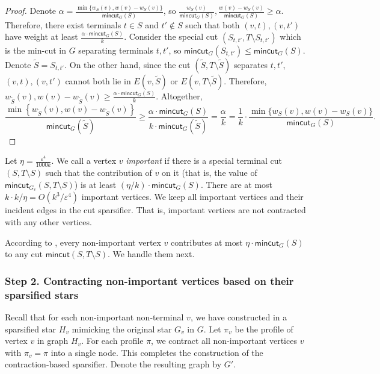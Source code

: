 \documentclass[11pt]{article}
\theoremstyle{definition}
\newcommand{\set}[1]{\left\{ #1 \right\}}
\newcommand{\eps}{{\varepsilon}}
\newcounter{note}
\newcommand{\mc}{\mathsf{mincut}}
\begin{document}
\begin{proof}
Denote $\alpha=\frac{\min \{w_{S}(v),w(v)-w_{S}(v)\}}{\mc_G(S)}$, so $\frac{w_S(v)}{\mc_G(S)},\frac{w(v)-w_S(v)}{\mc_G(S)}\ge \alpha$. Therefore, there exist terminals $t\in S$ and $t' \notin S$ such that both $(v,t),(v,t')$ have weight at least $\frac{\alpha \cdot \mc_G(S)}{k}$. Consider the special cut $(S_{t,t'},T\setminus S_{t,t'})$ which is the min-cut in $G$ separating terminals $t,t'$, so $\mc_G(S_{t,t'})\le \mc_G(S)$.
Denote $\tilde S=S_{t,t'}$.
On the other hand, since the cut $(\tilde S,T\setminus \tilde S)$ separates $t,t'$, $(v,t),(v,t')$ cannot both lie in $E(v,\tilde S)$ or $E(v,T\setminus \tilde S)$. Therefore, $w_{\tilde S}(v),w(v)-w_{\tilde S}(v)\ge \frac{\alpha \cdot \mc_G(S)}{k}$.
Altogether,
\[\frac{\min\set{w_{\tilde S}(v),w(v)-w_{\tilde S}(v)}}{\mc_G(\tilde S)}\ge \frac{\alpha \cdot \mc_G(S)}{k\cdot \mc_G(\tilde S)}=\frac{\alpha}{k}=\frac{1}{k}\cdot \frac{\min \{w_S(v),w(v)-w_S(v)\}}{\mc_G(S)}.\]
\end{proof}

Let $\eta = \frac{\eps^4}{1000k}$. We call a vertex $v$ \emph{important} if there is a special terminal cut $(S,T\setminus S)$ such that the contribution of $v$ on it (that is, the value of $\mc_{G_v}(S,T\setminus S)$) is at least $(\eta/k)\cdot \mc_G(S)$. There are at most $k \cdot k/\eta  = O(k^3/\eps^4)$ important vertices. We keep all important vertices and their incident edges in the cut sparsifier. That is, important vertices are not contracted with any other vertices.

According to , every non-important vertex $v$ contributes at most $\eta \cdot \mc_G(S)$ to any cut $\mc(S,T\setminus S)$. We handle them next.



\subsubsection*{Step 2. Contracting non-important vertices based on their sparsified stars}

Recall that for each non-important non-terminal $v$, we have constructed in  a sparsified star $H_v$ mimicking the original star $G_v$ in $G$. Let $\pi_v$ be the profile of vertex $v$ in graph $H_v$. For each profile $\pi$, we contract all non-important vertices $v$ with $\pi_v=\pi$ into a single node. This completes the construction of the contraction-based sparsifier. Denote the resulting graph by $G'$.
\end{document}
